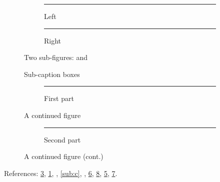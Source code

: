 \documentclass{article}
\begin{document}
\listoffigures

\begin{figure}[h]
  \centering
  \begin{subfigure}{.4\linewidth}
    \centering
    \rule{2cm}{1cm}
    \caption{Left}
    \label{sub:a}
  \end{subfigure}%
  \begin{subfigure}{.4\linewidth}
    \centering
    \rule{2cm}{1cm}
    \caption{Right}
    \label{sub:b}
  \end{subfigure}
  \caption{Two sub-figures:  and }
  \label{fig:sub}
\end{figure}

\begin{figure}[h]
  \centering
  \qquad
  \caption{Sub-caption boxes}
  \label{fig:box}
\end{figure}

\begin{figure}[h]
  \centering
  \begin{subfigure}{.4\linewidth}
    \centering
    \rule{2cm}{1cm}
    \caption{First part}
    \label{sub:e}
  \end{subfigure}
  \caption{A continued figure}
  \label{fig:cont1}
\end{figure}

\begin{figure}[h]
  \ContinuedFloat
  \centering
  \begin{subfigure}{.4\linewidth}
    \centering
    \rule{2cm}{1cm}
    \caption{Second part}
    \label{sub:f}
  \end{subfigure}
  \caption{A continued figure (cont.)}
  \label{fig:cont2}
\end{figure}

References: \ref{fig:sub}, \ref{sub:a}, , \ref{sub:c}, ,
\ref{fig:cont1}, \ref{fig:cont2}, \ref{sub:e}, \ref{sub:f}.
\end{document}
